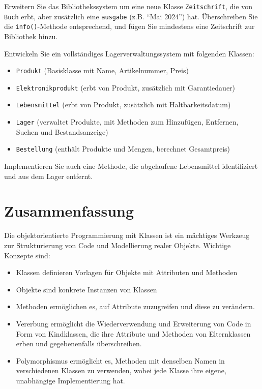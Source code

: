 \begin{myexercise}
	Erweitern Sie das Bibliothekssystem um eine neue Klasse \lstinline|Zeitschrift|, die von \lstinline|Buch| erbt, aber zusätzlich eine \lstinline|ausgabe| (z.B. \enquote{Mai 2024}) hat. Überschreiben Sie die \lstinline|info()|-Methode entsprechend, und fügen Sie mindestens eine Zeitschrift zur Bibliothek hinzu.

	\begin{myanswer}
		
	\end{myanswer}
\end{myexercise}

\begin{mychallenge}
	Entwickeln Sie ein vollständiges Lagerverwaltungssystem mit folgenden Klassen:
	\begin{itemize}
		\item \lstinline|Produkt| (Basisklasse mit Name, Artikelnummer, Preis)
		\item \lstinline|Elektronikprodukt| (erbt von Produkt, zusätzlich mit Garantiedauer)
		\item \lstinline|Lebensmittel| (erbt von Produkt, zusätzlich mit Haltbarkeitsdatum)
		\item \lstinline|Lager| (verwaltet Produkte, mit Methoden zum Hinzufügen, Entfernen, Suchen und Bestandsanzeige)
		\item \lstinline|Bestellung| (enthält Produkte und Mengen, berechnet Gesamtpreis)
	\end{itemize}

	Implementieren Sie auch eine Methode, die abgelaufene Lebensmittel identifiziert und aus dem Lager entfernt.
\end{mychallenge}



\section{Zusammenfassung}
Die objektorientierte Programmierung mit Klassen ist ein mächtiges Werkzeug zur Strukturierung von Code und Modellierung realer Objekte. Wichtige Konzepte sind:

\begin{itemize}
	\item Klassen definieren Vorlagen für Objekte mit Attributen und Methoden
	\item Objekte sind konkrete Instanzen von Klassen
	\item Methoden ermöglichen es, auf Attribute zuzugreifen und diese zu verändern.
	\item Vererbung ermöglicht die Wiederverwendung und Erweiterung von Code in Form von Kindklassen, die ihre Attribute und Methoden von Elternklassen erben und gegebenenfalls überschreiben.
	\item Polymorphismus ermöglicht es, Methoden mit denselben Namen in verschiedenen Klassen zu verwenden, wobei jede Klasse ihre eigene, unabhängige Implementierung hat.
\end{itemize}

